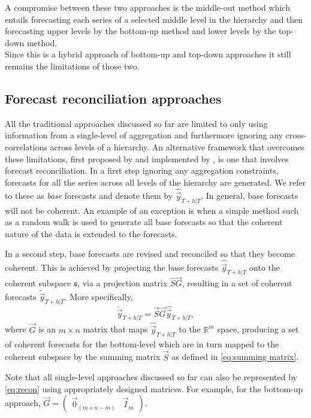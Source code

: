 \documentclass[graybox]{svmult}
\begin{document}
A compromise between these two approaches is the middle-out method which entails forecasting each series of a selected middle level in the hierarchy and then forecasting upper levels by the bottom-up method and lower levels by the top-down method.\\
Since this is a hybrid approach of bottom-up and top-down approaches it still remains the limitations of those two.

\subsection{Forecast reconciliation approaches}\label{sec:reconciliation approaches}

All the traditional approaches discussed so far are limited to only using information from a single-level of aggregation and furthermore ignoring any cross-correlations across levels of a hierarchy. An alternative framework that overcomes these limitations, first proposed by \citet{HynEtAl2011} and implemented by \citet{AthEtAl2009}, is one that involves forecast reconciliation. In a first step ignoring any aggregation constraints, forecasts for all the series across all levels of the hierarchy are generated. We refer to these as \textit{base} forecasts and denote them by $\hat{\vec{y}}_{T+h|T}$. In general, base forecasts will not be coherent. An example of an exception is when a simple method such as a random walk is used to generate all base forecasts so that the coherent nature of the data is extended to the forecasts.

In a second step, base forecasts are revised and reconciled so that they become coherent. This is achieved by projecting the base forecasts $\hat{\vec{y}}_{T+h|T}$ onto the coherent subspace $\mathfrak{s}$, via a projection matrix $\vec{SG}$, resulting in a set of coherent forecasts $\tilde{\vec{y}}_{T+h|T}$. More specifically,
\begin{equation}\label{eq:recon}
\tilde{\vec{y}}_{T+h|T}=\vec{S}\vec{G}\hat{\vec{y}}_{T+h|T},
\end{equation}
where $\vec{G}$ is an $m\times n$ matrix that maps $\hat{\vec{y}}_{T+h|T}$ to the $\mathbb{R}^m$ space, producing a set of coherent forecasts for the bottom-level which are in turn mapped to the coherent subspace by the summing matrix $\vec{S}$ as defined in \eqref{eq:summing matrix}.

Note that all single-level approaches discussed so far can also be represented by \eqref{eq:recon} using appropriately designed  matrices. For example, for the bottom-up approach, $\vec{G}=\begin{pmatrix}
\vec{0}_{(m \times n-m)} & \vec{I}_m
\end{pmatrix}$. 
\end{document}
